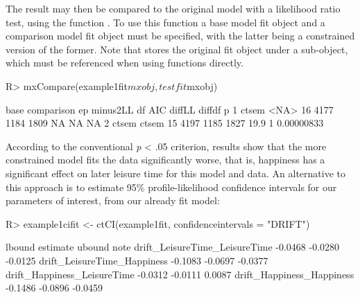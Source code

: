 \documentclass[nojss]{jss}\usepackage[]{graphicx}\usepackage[]{color}
\begin{document}
\begin{Schunk}
\end{Schunk}

The result may then be compared to the original model with a likelihood ratio test, using the  function . To use this function a base model fit object and a comparison model fit object must be specified, with the latter being a constrained version of the former. Note that  stores the original  fit object under a  sub-object, which must be referenced when using  functions directly.
\begin{Schunk}
\begin{Sinput}
R> mxCompare(example1fit$mxobj, testfit$mxobj)
\end{Sinput}
\begin{Soutput}
   base comparison ep minus2LL   df  AIC diffLL diffdf          p
1 ctsem       <NA> 16     4177 1184 1809     NA     NA         NA
2 ctsem      ctsem 15     4197 1185 1827   19.9      1 0.00000833
\end{Soutput}
\end{Schunk}
According to the conventional \textit{p} < .05 criterion, results show that the more constrained model fits the data significantly worse, that is, happiness has a significant effect on later leisure time for this model and data. 
An alternative to this approach is to estimate 95\% profile-likelihood confidence intervals for our parameters of interest, from our already fit model:

\begin{Schunk}
\begin{Sinput}
R> example1cifit <- ctCI(example1fit, confidenceintervals = "DRIFT")
\end{Sinput}
\begin{Soutput}
                               lbound estimate  ubound note
drift_LeisureTime_LeisureTime -0.0468  -0.0280 -0.0125     
drift_LeisureTime_Happiness   -0.1083  -0.0697 -0.0377     
drift_Happiness_LeisureTime   -0.0312  -0.0111  0.0087     
drift_Happiness_Happiness     -0.1486  -0.0896 -0.0459     
\end{Soutput}
\end{Schunk}
\end{document}
